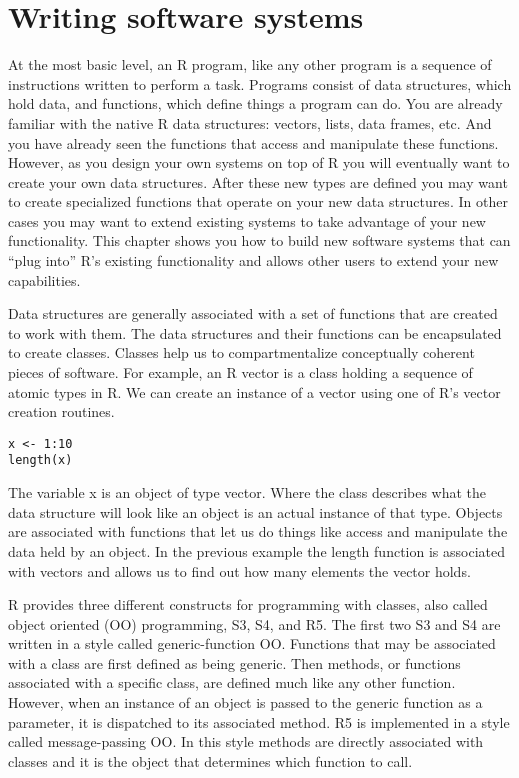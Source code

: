 \hypertarget{writing-software-systems}{%
\chapter{Writing software systems}\label{writing-software-systems}}

At the most basic level, an R program, like any other program is a
sequence of instructions written to perform a task. Programs consist of
data structures, which hold data, and functions, which define things a
program can do. You are already familiar with the native R data
structures: vectors, lists, data frames, etc. And you have already seen
the functions that access and manipulate these functions. However, as
you design your own systems on top of R you will eventually want to
create your own data structures. After these new types are defined you
may want to create specialized functions that operate on your new data
structures. In other cases you may want to extend existing systems to
take advantage of your new functionality. This chapter shows you how to
build new software systems that can ``plug into'' R's existing
functionality and allows other users to extend your new capabilities.

Data structures are generally associated with a set of functions that
are created to work with them. The data structures and their functions
can be encapsulated to create classes. Classes help us to
compartmentalize conceptually coherent pieces of software. For example,
an R vector is a class holding a sequence of atomic types in R. We can
create an instance of a vector using one of R's vector creation
routines.

\begin{verbatim}
x <- 1:10
length(x)
\end{verbatim}

The variable x is an object of type vector. Where the class describes
what the data structure will look like an object is an actual instance
of that type. Objects are associated with functions that let us do
things like access and manipulate the data held by an object. In the
previous example the length function is associated with vectors and
allows us to find out how many elements the vector holds.

R provides three different constructs for programming with classes, also
called object oriented (OO) programming, S3, S4, and R5. The first two
S3 and S4 are written in a style called generic-function OO. Functions
that may be associated with a class are first defined as being generic.
Then methods, or functions associated with a specific class, are defined
much like any other function. However, when an instance of an object is
passed to the generic function as a parameter, it is dispatched to its
associated method. R5 is implemented in a style called message-passing
OO. In this style methods are directly associated with classes and it is
the object that determines which function to call.

